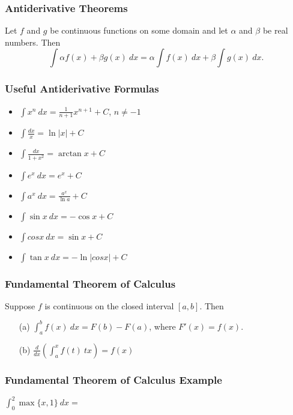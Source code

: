 \documentclass{beamer}
\begin{document}
\begin{frame}
\frametitle{Antiderivative Theorems}
\begin{Theorem}
Let $f$ and $g$ be continuous functions on some domain and let $\alpha$ and $\beta$ be real numbers. Then
$$
\int \alpha f(x) + \beta g(x)\ dx = \alpha \int f(x)\ dx + \beta \int g(x)\ dx.
$$
\end{Theorem}
\end{frame}

\begin{frame}
\frametitle{Useful Antiderivative Formulas}
\begin{multicols}{2}
{\small 
\begin{itemize}
\item $\displaystyle \int x^n\ dx = \frac{1}{n+ 1} x^{n+ 1} + C$, $n\neq -1$
\item $\displaystyle \int \frac{dx}{x} = \ln|x| + C$	
\item $\displaystyle \int \frac{dx}{1 + x^2} = \arctan x + C$	
\item $\displaystyle \int e^x\ dx  = e^x + C$
\item $\displaystyle \int a^x\ dx = \frac{a^x}{\ln a} + C$
\item $\displaystyle\int \sin x\ dx = -\cos x + C$
\item $\displaystyle \int cos x\ dx= \sin x + C$
\item $\displaystyle\int \tan x\ dx = -\ln|cos x| + C$
\end{itemize}
}
\end{multicols}

\end{frame}

\begin{frame}
\frametitle{Fundamental Theorem of Calculus}

\begin{Theorem}
Suppose $f$ is continuous on the closed interval $[a, b]$. Then
\begin{enumerate}
\item[(a)] $\displaystyle\int_a^b f(x)\ dx = F(b) - F(a)$, where $F'(x)= f(x)$.
\item[(b)] $\displaystyle\frac{d}{dx}\left(\int_a^x f(t)\ tx\right) = f(x)$
\end{enumerate}
\end{Theorem}
\end{frame}

\begin{frame}[t]
\frametitle{Fundamental Theorem of Calculus Example}

\begin{Example}
$\displaystyle \int_0^2 \max\{x, 1\}\ dx = $
\end{Example}

\end{frame}
\end{document}
